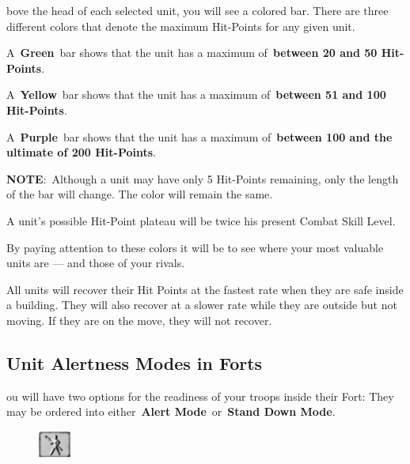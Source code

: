 
bove the head of each selected unit, you will see a colored bar. There are three different colors that denote the maximum Hit-Points for any given unit.

A \textbf{Green} bar shows that the unit has a maximum of \textbf{between 20 and 50 Hit-Points}.

A \textbf{Yellow} bar shows that the unit has a maximum of \textbf{between 51 and 100 Hit-Points}.

A \textbf{Purple} bar shows that the unit has a maximum of \textbf{between 100 and the ultimate of 200 Hit-Points}.

\textbf{NOTE}: Although a unit may have only 5 Hit-Points remaining, only the length of the bar will change. The color will remain the same.

A unit’s possible Hit-Point plateau will be twice his present Combat Skill Level.

By paying attention to these colors it will be to see where your most valuable units are --- and those of your rivals.

All units will recover their Hit Points at the fastest rate when they are safe inside a building. They will also recover at a slower rate while they are outside but not moving. If they are on the move, they will not recover.

\subsection{Unit Alertness Modes in Forts}


ou will have two options for the readiness of your troops inside their Fort: They may be ordered into either \textbf{Alert Mode} or \textbf{Stand Down Mode}.

\begin{figure}
	\vspace{-20pt}
	\begin{center}
		\includegraphics[width=0.1\textwidth]{Talert}
	\end{center}
	\vspace{-20pt}
\end{figure}


